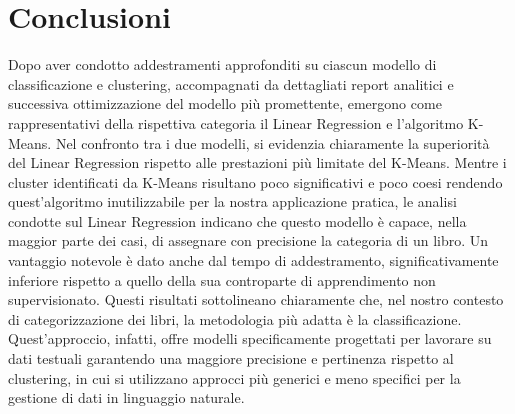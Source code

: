 \documentclass[12pt,oneside]{article}
\begin{document}
    \section{Conclusioni}
    \begin{justify}
        Dopo aver condotto addestramenti approfonditi su ciascun modello di classificazione e clustering, accompagnati da dettagliati report analitici e successiva ottimizzazione del modello più promettente, emergono come rappresentativi della rispettiva categoria il Linear Regression e l'algoritmo K-Means.
        Nel confronto tra i due modelli, si evidenzia chiaramente la superiorità del Linear Regression rispetto alle prestazioni più limitate del K-Means. 
        Mentre i cluster identificati da K-Means risultano poco significativi e poco coesi rendendo quest'algoritmo inutilizzabile per la nostra applicazione pratica, le analisi condotte sul Linear Regression indicano che questo modello è capace, nella maggior parte dei casi, di assegnare con precisione la categoria di un libro. Un vantaggio notevole è dato anche dal tempo di addestramento, significativamente inferiore rispetto a quello della sua controparte di apprendimento non supervisionato.
        Questi risultati sottolineano chiaramente che, nel nostro contesto di categorizzazione dei libri, la metodologia più adatta è la classificazione. Quest’approccio, infatti, offre modelli specificamente progettati per lavorare su dati testuali garantendo una maggiore precisione e pertinenza rispetto al clustering, in cui si utilizzano approcci più generici e meno specifici per la gestione di dati in linguaggio naturale. 
    \end{justify}
\end{document}
